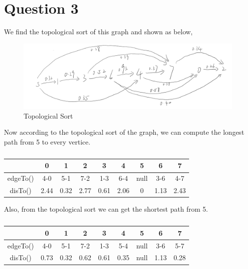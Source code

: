 \documentclass[conference]{IEEEtran}
\begin{document}
\section*{Question 3}

We find the topological sort of this graph and shown as below,

\begin{figure}[H]
    \centerline{\includegraphics[scale=0.5]{pic/pic1.png}}
    \caption{Topological Sort}
\end{figure}

Now according to the topological sort of the graph, we can compute 
the longest path from 5 to every vertice.

\begin{table}[H]
    \caption{}
    \begin{center}
        \begin{tabular}{|c|c|c|c|c|c|c|c|c|}
            \hline
            &0&1&2&3&4&5&6&7\\
            \hline
            edgeTo()&4-0&5-1&7-2&1-3&6-4&null&3-6&4-7\\
            \hline
            disTo()&2.44&0.32&2.77&0.61&2.06&0&1.13&2.43\\
            \hline
        \end{tabular}
    \end{center}
\end{table}

Also, from the topological sort we can get the shortest path from 5.

\begin{table}[H]
    \caption{}
    \begin{center}
        \begin{tabular}{|c|c|c|c|c|c|c|c|c|}
            \hline
            &0&1&2&3&4&5&6&7\\
            \hline
            edgeTo()&4-0&5-1&7-2&1-3&5-4&null&3-6&5-7\\
            \hline
            disTo()&0.73&0.32&0.62&0.61&0.35&null&1.13&0.28\\
            \hline
        \end{tabular}
    \end{center}
\end{table}
\end{document}
